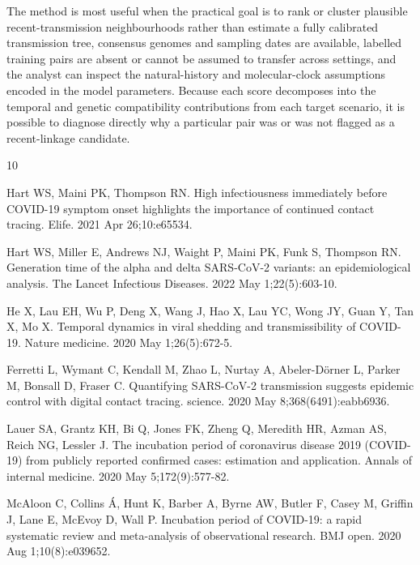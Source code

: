 \documentclass[11pt,a4paper]{article}
\begin{document}
The method is most useful when the practical goal is to rank or cluster plausible recent-transmission neighbourhoods rather than estimate a fully calibrated transmission tree, consensus genomes and sampling dates are available, labelled training pairs are absent or cannot be assumed to transfer across settings, and the analyst can inspect the natural-history and molecular-clock assumptions encoded in the model parameters. Because each score decomposes into the temporal and genetic compatibility contributions from each target scenario, it is possible to diagnose directly why a particular pair was or was not flagged as a recent-linkage candidate.

\begin{thebibliography}{10}

	Hart WS, Maini PK, Thompson RN. High infectiousness immediately before COVID-19 symptom onset highlights the importance of continued contact tracing. Elife. 2021 Apr 26;10:e65534.%

	Hart WS, Miller E, Andrews NJ, Waight P, Maini PK, Funk S, Thompson RN. Generation time of the alpha and delta SARS-CoV-2 variants: an epidemiological analysis. The Lancet Infectious Diseases. 2022 May 1;22(5):603-10.%

	He X, Lau EH, Wu P, Deng X, Wang J, Hao X, Lau YC, Wong JY, Guan Y, Tan X, Mo X. Temporal dynamics in viral shedding and transmissibility of COVID-19. Nature medicine. 2020 May 1;26(5):672-5.%

	Ferretti L, Wymant C, Kendall M, Zhao L, Nurtay A, Abeler-Dörner L, Parker M, Bonsall D, Fraser C. Quantifying SARS-CoV-2 transmission suggests epidemic control with digital contact tracing. science. 2020 May 8;368(6491):eabb6936.%

	Lauer SA, Grantz KH, Bi Q, Jones FK, Zheng Q, Meredith HR, Azman AS, Reich NG, Lessler J. The incubation period of coronavirus disease 2019 (COVID-19) from publicly reported confirmed cases: estimation and application. Annals of internal medicine. 2020 May 5;172(9):577-82.%

	McAloon C, Collins Á, Hunt K, Barber A, Byrne AW, Butler F, Casey M, Griffin J, Lane E, McEvoy D, Wall P. Incubation period of COVID-19: a rapid systematic review and meta-analysis of observational research. BMJ open. 2020 Aug 1;10(8):e039652.


\end{thebibliography}
\end{document}
